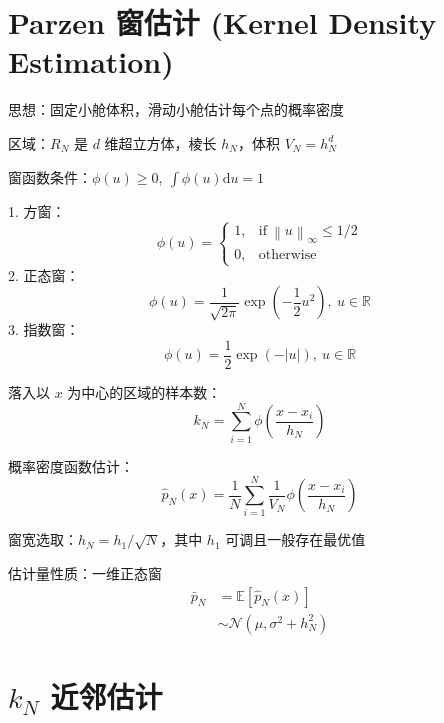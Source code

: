 \documentclass[openany]{ctexbook}
\theoremstyle{kaiti}
\theoremstyle{normal}
\begin{document}
\section{Parzen 窗估计 (Kernel Density Estimation) }

思想：固定小舱体积，滑动小舱估计每个点的概率密度

区域：$R_N$ 是 $d$ 维超立方体，棱长 $h_N$，体积 $V_N=h_{N}^{d}$

窗函数条件：$\displaystyle\phi \left(u \right)\geqslant 0,~\int{\phi \left(u \right)\mathrm{d}u}=1$

1. 方窗：
  \begin{equation}
  \phi \left(u \right)=
  \begin{cases}
    1, &\mathrm{if}~\left\| u \right\|_{\infty}\leqslant 1/2\\
    0, &\mathrm{otherwise}
  \end{cases}
  \end{equation}
2. 正态窗：
  \begin{equation}
  \phi \left(u \right)=\frac{1}{\sqrt{2\pi}}\exp \left(-\frac{1}{2}u^2 \right),~u\in\mathbb{R}
  \end{equation}
3. 指数窗：
  \begin{equation}
  \phi \left(u \right)=\frac{1}{2}\exp \left(-|u| \right),~u\in\mathbb{R}
  \end{equation}

落入以 $x$ 为中心的区域的样本数：
\begin{equation}
k_N=\sum_{i=1}^N{\phi \left(\frac{x-x_i}{h_N} \right)}
\end{equation}

概率密度函数估计：
\begin{equation}
\hat{p}_N(x)=\frac{1}{N}\sum_{i=1}^N{\frac{1}{V_N}\phi \left(\frac{x-x_i}{h_N} \right)}
\end{equation}

窗宽选取：$h_N=h_1/\sqrt{N}$，其中 $h_1$ 可调且一般存在最优值

估计量性质：一维正态窗
\begin{equation}
\begin{aligned}
  \bar{p}_N
  &=\mathbb{E} \left[\hat{p}_N(x)\right] \\
  &\sim \mathcal{N} \left(\mu ,\sigma^2+h_{N}^{2} \right)
\end{aligned}
\end{equation}

\section{\texorpdfstring{$k_N$}{kN} 近邻估计}
\end{document}
